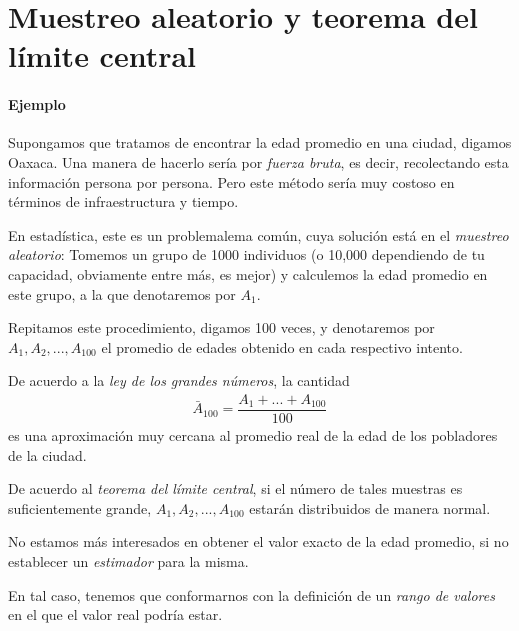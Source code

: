 \section{Muestreo aleatorio y teorema del límite central}

\paragraph{Ejemplo}
 Supongamos que tratamos de encontrar la edad promedio en una ciudad, digamos Oaxaca. Una manera de hacerlo sería por \emph{fuerza bruta}, es decir, recolectando esta información persona por persona. Pero este método sería muy costoso en términos de infraestructura y tiempo.


 En estadística, este es un problemalema común, cuya solución está en el \emph{muestreo aleatorio}:  Tomemos un grupo de 1000 individuos (o 10,000 dependiendo de tu capacidad, obviamente entre más, es mejor) y calculemos la edad promedio en este grupo, a la que denotaremos por $A_{1}.$ 


 Repitamos este procedimiento, digamos 100 veces, y denotaremos por $A_{1}, A_{2},...,A_{100}$ el promedio de edades obtenido en cada respectivo intento.
 
 De acuerdo a la \emph{ley de los grandes números}, la cantidad
 \begin{align}
  \bar{A}_{100}=\dfrac{A_{1}+...+A_{100}}{100}
 \end{align}
es una aproximación muy cercana al promedio real de la edad de los pobladores de la ciudad.


 De acuerdo al \emph{teorema del límite central}, si el número de tales muestras es suficientemente grande,
 $A_{1},A_{2},...,A_{100}$ estarán distribuidos de manera normal.


 \begin{rem}
  No estamos más interesados en obtener el valor exacto de la edad promedio, si no establecer un \emph{estimador} para la misma. 

  En tal caso,
tenemos que conformarnos con la definición de un \emph{rango de valores} en el que el valor real podría estar.
 \end{rem}


% 
% 

